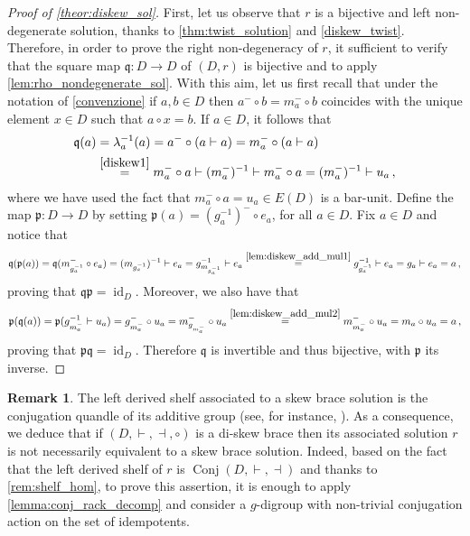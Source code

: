 \documentclass[preprint,1p]{elsarticle}
\numberwithin{equation}{section}
\theoremstyle{definition}               %
\newtheorem{rem}[theor]{Remark}
\newcommand{\vd}{\vdash}
\newcommand{\dv}{\dashv}
\newcommand{\overeq}[1]{\overset{#1}{=}}
\DeclareMathOperator{\Conj}{Conj}
\DeclareMathOperator{\id}{id}
\begin{document}
\begin{proof}[Proof of \cref{theor:diskew_sol}]
    First, let us observe that $r$ is a bijective and left non-degenerate solution, thanks to \cref{thm:twist_solution} and \cref{diskew_twist}.
    Therefore, in order to prove the right non-degeneracy of $r$, it sufficient to verify that the square map $\mathfrak{q}:D \to D$ of $(D,r)$ is bijective and to apply \cref{lem:rho_nondegenerate_sol}.
    With this aim, let us {first recall that under the notation of \cref{convenzione} if $a,b \in D$ then $a^- \circ b = m_a^- \circ b$ coincides with the unique element $x \in D$ such that $a \circ x = b$.
    If $a \in D$, it follows that}
    \begin{align*}
        \mathfrak{q}(a) 
        &= \lambda^{-1}_a(a) 
        = a^{-} \circ (a \vdash a) 
        = {m_a^{-} \circ (a \vdash a)}\\
        &\overset{\eqref{diskew1}}{=} m_a^{-}\circ a \vdash (m_a^{-})^{-1} \vdash m_a^{-} \circ a 
        = (m_a^{-})^{-1} \vdash u_a \,,
    \end{align*}
    where we have used the fact that $m_a^-\circ a = u_a\in E(D)$ {is a bar-unit}.
    Define the map $\mathfrak{p}:D \to D$ by setting $\mathfrak{p}(a) = ({g^{-1}_a})^{-} \circ e_a$, for all $a \in D$.
    Fix $a \in D$ and notice that
    \begin{align*}
        \mathfrak{q}(\mathfrak{p}(a)) 
        =\mathfrak{q}(m_{g^{-1}_a}^{-} \circ e_a)
        = (m_{g^{-1}_a})^{-1} \vd e_a 
        = g^{-1}_{m_{g^{-1}_a}} \vd e_a 
        \overeq{\eqref{lem:diskew_add_mul1}} g^{-1}_{g^{-1}_a}\vd e_a 
        = g_a \vd e_a
        = a \,,
    \end{align*}
    proving that $\mathfrak{q}\mathfrak{p} = \id_D$.
    Moreover, we also have that
    \begin{align*}
        \mathfrak{p}(\mathfrak{q}(a)) 
        =\mathfrak{p}(g_{m^{-}_a}^{-1} \vd u_a)
        = g^{-}_{m^{-}_a} \circ u_a
        = m^{-}_{g_{m^{-}_a}} \circ u_a
        \overeq{\eqref{lem:diskew_add_mul2}} m^{-}_{m^{-}_a} \circ u_a
        = m_a \circ u_a
        = a \,,
    \end{align*}
    proving that $\mathfrak{pq} = \id_D$.
    Therefore $\mathfrak{q}$ is invertible and thus bijective, with $\mathfrak{p}$ its inverse.
\end{proof}

\begin{rem}
    The left derived shelf associated to a skew brace solution is the conjugation quandle of its additive group (see, for instance, \cite{DoRySte24}).
    As a consequence, we deduce that if $(D,\vd,\dv,\circ)$ is a di-skew brace then its associated solution $r$ is not necessarily equivalent to a skew brace solution.
    Indeed, based on the fact that the left derived shelf of $r$ is $\Conj(D,\vd,\dv)$ {and thanks to \cref{rem:shelf_hom}}, to prove this assertion, it is enough to apply \cref{lemma:conj_rack_decomp} and consider a $g$-digroup with non-trivial conjugation action on the set of idempotents.
\end{rem}
\end{document}
